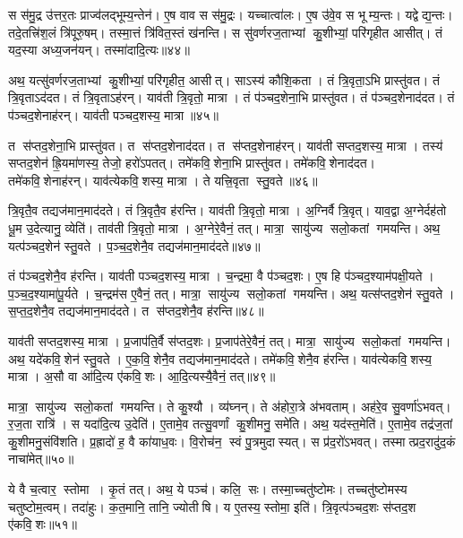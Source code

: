 स स॑मु॒द्र उ॑त्तर॒तः प्राज्व॑लद्भूम्य॒न्तेन॑।
ए॒ष वाव स स॑मु॒द्रः।
यच्चात्वा॑लः।
ए॒ष उ॑वे॒व स भूम्य॒न्तः।
यद्वेद्य॒न्तः।
तदे॒तत्त्रि॑श॒लं त्रि॑पूरु॒षम्।
तस्मा॒त्तं त्रि॑वित॒स्तं ख॑नन्ति।
स सु॑वर्णरज॒ताभ्यां कु॒शीभ्यां॒ परि॑गृहीत आसीत्।
तं यद॒स्या अध्य॒जन॑यन्।
तस्मा॑दादि॒त्यः॥४४॥

अथ॒ यत्सु॑वर्णरज॒ताभ्यां कु॒शीभ्यां॒ परि॑गृहीत॒ आसीत्।
साऽस्य॑ कौशि॒कता।
तं त्रि॒वृता॒ऽभि प्रास्तु॑वत।
तं त्रि॒वृताऽद॑दत।
तं त्रि॒वृताऽह॑रन्।
याव॑ती त्रि॒वृतो॒ मात्रा।
तं प॑ञ्चद॒शेना॒भि प्रास्तु॑वत।
तं प॑ञ्चद॒शेनाद॑दत।
तं प॑ञ्चद॒शेनाह॑रन्।
याव॑ती पञ्चद॒शस्य॒ मात्रा॥४५॥

त स॑प्तद॒शेना॒भि प्रास्तु॑वत।
त स॑प्तद॒शेनाद॑दत।
त स॑प्तद॒शेनाह॑रन्।
याव॑ती सप्तद॒शस्य॒ मात्रा।
तस्य॑ सप्तद॒शेन॑ ह्रि॒यमा॑णस्य॒ तेजो॒ हरो॑ऽपतत्।
तमे॑कवि॒शेना॒भि प्रास्तु॑वत।
तमे॑कवि॒शेनाद॑दत।
तमे॑कवि॒शेनाह॑रन्।
याव॑त्येकवि॒शस्य॒ मात्रा।
ते यत्त्रि॒वृता स्तु॒वते॥४६॥

त्रि॒वृतै॒व तद्यज॑मान॒माद॑दते।
तं त्रि॒वृतै॒व ह॑रन्ति।
याव॑ती त्रि॒वृतो॒ मात्रा।
अ॒ग्निर्वै त्रि॒वृत्।
याव॒द्वा अ॒ग्नेर्दह॑तो धू॒म उ॒देत्यानु॒ व्येति॑।
ताव॑ती त्रि॒वृतो॒ मात्रा।
अ॒ग्नेरे॒वैनं॒ तत्।
मात्रा॒ सायु॑ज्य सलो॒कतां गमयन्ति।
अथ॒ यत्प॑ञ्चद॒शेन॑ स्तु॒वते।
प॒ञ्च॒द॒शेनै॒व तद्यज॑मान॒माद॑दते॥४७॥

तं प॑ञ्चद॒शेनै॒व ह॑रन्ति।
याव॑ती पञ्चद॒शस्य॒ मात्रा।
च॒न्द्रमा॒ वै प॑ञ्चद॒शः।
ए॒ष हि प॑ञ्चद॒श्याम॑पक्षी॒यते।
प॒ञ्च॒द॒श्यामा॑पू॒र्यते।
च॒न्द्रम॑स ए॒वैनं॒ तत्।
मात्रा॒ सायु॑ज्य सलो॒कतां गमयन्ति।
अथ॒ यत्स॑प्तद॒शेन॑ स्तु॒वते।
स॒प्त॒द॒शेनै॒व तद्यज॑मान॒माद॑दते।
त स॑प्तद॒शेनै॒व ह॑रन्ति॥४८॥

याव॑ती सप्तद॒शस्य॒ मात्रा।
प्र॒जाप॑ति॒र्वै स॑प्तद॒शः।
प्र॒जाप॑तेरे॒वैनं॒ तत्।
मात्रा॒ सायु॑ज्य सलो॒कतां गमयन्ति।
अथ॒ यदे॑कवि॒शेन॑ स्तु॒वते।
ए॒क॒वि॒शेनै॒व तद्यज॑मान॒माद॑दते।
तमे॑कवि॒शेनै॒व ह॑रन्ति।
याव॑त्येक\-वि॒शस्य॒ मात्रा।
अ॒सौ वा आ॑दि॒त्य ए॑कवि॒शः।
आ॒दि॒त्यस्यै॒वैनं॒ तत्॥४९॥

मात्रा॒ सायु॑ज्य सलो॒कतां गमयन्ति।
ते कु॒श्यौ।
व्य॑घ्नन्।
ते अ॑होरा॒त्रे अ॑भवताम्।
अह॑रे॒व सु॒वर्णा॑ऽभवत्।
र॒ज॒ता रात्रि॑।
स यदा॑दि॒त्य उ॒देति॑।
ए॒तामे॒व तत्सु॒वर्णां कु॒शीमनु॒ समे॑ति।
अथ॒ यद॑स्त॒मेति॑।
ए॒तामे॒व तद्र॑ज॒तां कु॒शीमनु॒संवि॑शति।
प्र॒ह्रादो॑ ह॒ वै का॑याध॒वः।
वि॒रोच॑न॒ स्वं पु॒त्रमुदास्यत्।
स प्र॑द॒रो॑ऽभवत्।
तस्मात्प्रद॒रादु॑द॒कं नाचा॑मेत्॥५०॥\anuvakamend[आ॒दि॒त्यः प॑ञ्चद॒शस्य॒ मात्रा स्तु॒वते॑ पञ्चद॒शेनै॒व तद्यज॑मान॒माद॑दते सप्तद॒शेनै॒व ह॑रन्त्यादि॒त्यस्यै॒वैनं॒ तद्वि॑शति च॒त्वारि॑ च]

ये वै च॒त्वार॒ स्तोमा।
कृ॒तं तत्।
अथ॒ ये पञ्च॑।
कलि॒ सः।
तस्मा॒च्चतु॑ष्टोमः।
तच्चतु॑ष्टोमस्य चतुष्टोम॒त्वम्।
तदा॑हुः।
क॒त॒मानि॒ तानि॒ ज्योतीषि।
य ए॒तस्य॒ स्तोमा॒ इति॑।
त्रि॒वृत्प॑ञ्चद॒शः स॑प्तद॒श ए॑कवि॒शः॥५१॥

